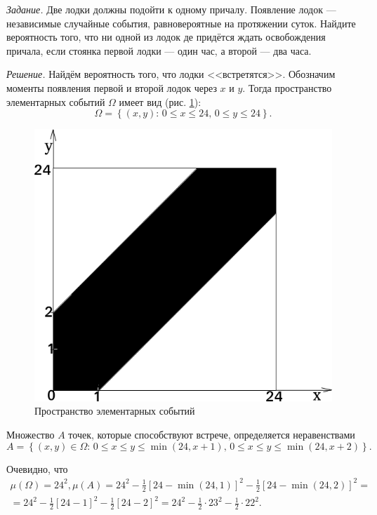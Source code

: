\textit{Задание.} Две лодки должны подойти к одному причалу.
Появление лодок --- независимые случайные события, равновероятные на протяжении суток.
Найдите вероятность того,
что ни одной из лодок де придётся ждать освобождения причала, если стоянка первой лодки --- один час, а второй --- два часа.

\textit{Решение.} Найдём вероятность того, что лодки <<встретятся>>.
Обозначим моменты появления первой и второй лодок через $x$ и $y$.
Тогда пространство элементарных событий $ \Omega $ имеет вид
(рис. \ref{fig:410}):
$$ \Omega = \left\{ \left( x, y \right): \, 0 \leq x \leq 24, \, 0 \leq y \leq 24 \right\}.$$

\begin{figure}[h!]
  \centering
  \includegraphics[width=.7\textwidth]{./pictures/4_10.png}
  \caption{Пространство элементарных событий}
  \label{fig:410}
\end{figure}

Множество $A$ точек, которые способствуют встрече, определяется неравенствами
$$A =
\left\{ \left( x, y \right) \in \Omega: \,
0 \leq x \leq y \leq \min \left( 24, x+1 \right), \,
0 \leq x \leq y \leq \min \left( 24, x+2 \right) \right\}.$$

Очевидно, что
\begin{equation*}
\begin{split}
 \mu \left( \Omega \right) = 24^2,
\mu \left( A \right) =
24^2 - \frac{1}{2} \left[ 24 - \min \left( 24, 1 \right) \right]^2 - \frac{1}{2} \left[ 24 - \min \left( 24, 2 \right) \right]^2 = \\
= 24^2 - \frac{1}{2} \left[ 24 - 1 \right]^2 - \frac{1}{2} \left[ 24 - 2 \right]^2 =
24^2 - \frac{1}{2} \cdot 23^2 - \frac{1}{2} \cdot 22^2.
\end{split}
\end{equation*}

